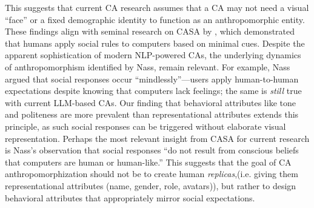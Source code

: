 \documentclass[manuscript,anonymous,sigconf]{acmart}
\begin{document}
This suggests that current CA research assumes that a CA may not need a visual ``face'' or a fixed demographic identity to function as an anthropomorphic entity. These findings align with seminal research on CASA by \citet{nass1994computers}, which demonstrated that humans apply social rules to computers based on minimal cues. Despite the apparent sophistication of modern NLP-powered CAs, the underlying dynamics of anthropomorphism identified by Nass, remain relevant. For example, Nass argued that social responses occur ``mindlessly''---users apply human-to-human expectations despite knowing that computers lack feelings; the same is \textit{still} true with current LLM-based CAs. Our finding that behavioral attributes like tone and politeness are more prevalent than representational attributes extends this principle, as such social responses can be triggered without elaborate visual representation. Perhaps the most relevant insight from CASA for current research is Nass's observation that social responses ``do not result from conscious beliefs that computers are human or human-like.'' This suggests that the goal of CA anthropomorphization should not be to create human \textit{replicas},(i.e. giving them representational attributes (name, gender, role, avatars)), but rather to design behavioral attributes that appropriately mirror social expectations.


\end{document}
